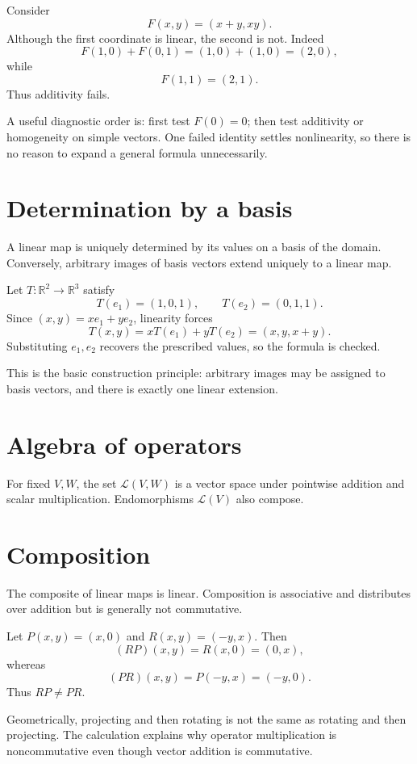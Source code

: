 \begin{example}\label{ex:i05-expand-01}
Consider
\[
F(x,y)=(x+y,xy).
\]
Although the first coordinate is linear, the second is not. Indeed
\[
F(1,0)+F(0,1)=(1,0)+(1,0)=(2,0),
\]
while
\[
F(1,1)=(2,1).
\]
Thus additivity fails.

A useful diagnostic order is: first test \(F(0)=0\); then test additivity or
homogeneity on simple vectors. One failed identity settles nonlinearity, so
there is no reason to expand a general formula unnecessarily.
\end{example}
\section{Determination by a basis}
A linear map is uniquely determined by its values on a basis of the domain. Conversely, arbitrary images of basis vectors extend uniquely to a linear map.


\begin{example}\label{ex:i05-expand-02}
Let \(T:\mathbb R^2\to\mathbb R^3\) satisfy
\[
T(e_1)=(1,0,1),\qquad T(e_2)=(0,1,1).
\]
Since \((x,y)=xe_1+ye_2\), linearity forces
\[
T(x,y)=xT(e_1)+yT(e_2)=(x,y,x+y).
\]
Substituting \(e_1,e_2\) recovers the prescribed values, so the formula is
checked.

This is the basic construction principle: arbitrary images may be assigned to
basis vectors, and there is exactly one linear extension.
\end{example}
\section{Algebra of operators}
For fixed $V,W$, the set $\mathcal L(V,W)$ is a vector space under pointwise addition and scalar multiplication. Endomorphisms $\mathcal L(V)$ also compose.

\section{Composition}
The composite of linear maps is linear. Composition is associative and distributes over addition but is generally not commutative.


\begin{example}\label{ex:i05-expand-03}
Let \(P(x,y)=(x,0)\) and \(R(x,y)=(-y,x)\). Then
\[
(RP)(x,y)=R(x,0)=(0,x),
\]
whereas
\[
(PR)(x,y)=P(-y,x)=(-y,0).
\]
Thus \(RP\neq PR\).

Geometrically, projecting and then rotating is not the same as rotating and
then projecting. The calculation explains why operator multiplication is
noncommutative even though vector addition is commutative.
\end{example}
